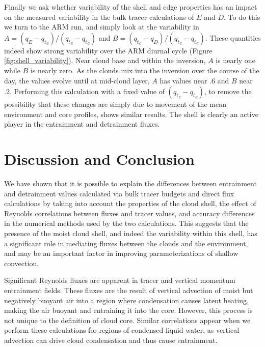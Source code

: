 \documentclass[draft,grl]{agutex}
\begin{document}
\begin{article}
Finally we ask whether variability of the shell and edge properties has an 
impact on the measured variability in the bulk tracer calculations of $E$ and 
$D$.  To do this we turn to the ARM run, and simply look at the variability in 
$A = (q_E - {q_t}_e)/({q_t}_c - {q_t}_e)$ and 
$B = ({q_t}_c - q_D)/({q_t}_c - {q_t}_e)$.  These quantities indeed show 
strong variability over the ARM diurnal cycle (Figure 
\ref{fig:shell_variability}).  Near cloud base and within the inversion, $A$ 
is nearly one while $B$ is nearly zero.  As the clouds mix into the inversion 
over the course of the day, the values evolve until at mid-cloud layer, $A$ 
has values near .6 and $B$ near .2.  Performing this calculation with a fixed 
value of $({q_t}_c - {q_t}_e)$, to remove the possibility that these changes 
are simply due to movement of the mean environment and core profiles, shows 
similar results.  The shell is clearly an active player in the entrainment and 
detrainment fluxes.


\section{Discussion and Conclusion}

We have shown that it is possible to explain the differences between entrainment and 
detrainment values calculated via bulk tracer budgets and direct flux 
calculations by taking into account the properties of the cloud shell, the 
effect of Reynolds correlations between fluxes and tracer values, and 
accuracy differences in the numerical methods used by the two calculations.
This suggests that the presence of the moist cloud shell, and indeed the 
variability within this shell, has a significant role in mediating fluxes 
between the clouds and the environment, and may be an important factor in 
improving parameterizations of shallow convection.

Significant Reynolds fluxes are apparent in tracer and vertical momentum 
entrainment fields.  These fluxes are the result of vertical advection of 
moist but negatively buoyant air into a region where condensation causes 
latent heating, making the air buoyant and entraining it into the core.
However, this process is not unique to the definition of cloud core.  Similar 
correlations appear when we perform these calculations for regions of
condensed liquid water, as vertical advection can drive cloud condensation and 
thus cause entrainment.


\end{article}
\end{document}

